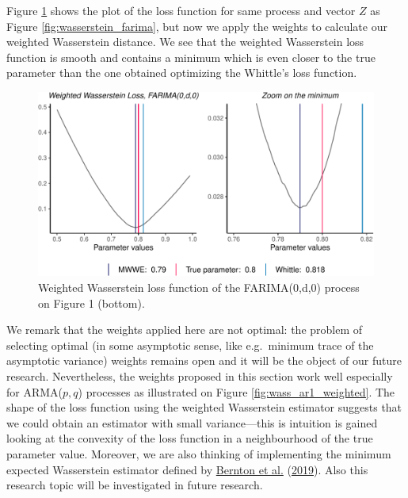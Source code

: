 \documentclass[
  11pt,
]{article}
\begin{document}
Figure \ref{fig:weighted_wasserstein} shows the plot of the loss
function for same process and vector \(Z\) as Figure
\ref{fig:wasserstein_farima}, but now we apply the weights to calculate
our weighted Wasserstein distance. We see that the weighted Wasserstein
loss function is smooth and contains a minimum which is even closer to
the true parameter than the one obtained optimizing the Whittle's loss
function.

\begin{figure}

{\centering \includegraphics[width=0.6\linewidth]{Master_thesis_V4_files/figure-latex/weighted_wasserstein-1} 

}

\caption{Weighted Wasserstein loss function of the FARIMA(0,d,0) process on Figure 1 (bottom).}\label{fig:weighted_wasserstein}
\end{figure}

We remark that the weights applied here are not optimal: the problem of
selecting optimal (in some asymptotic sense, like e.g.~minimum trace of
the asymptotic variance) weights remains open and it will be the object
of our future research. Nevertheless, the weights proposed in this
section work well especially for ARMA(\(p,q\)) processes as illustrated
on Figure \ref{fig:wass_ar1_weighted}. The shape of the loss function
using the weighted Wasserstein estimator suggests that we could obtain
an estimator with small variance---this is intuition is gained looking
at the convexity of the loss function in a neighbourhood of the true
parameter value. Moreover, we are also thinking of implementing the
minimum expected Wasserstein estimator defined by
\protect\hyperlink{ref-bernton2019parameter}{Bernton et al.}
(\protect\hyperlink{ref-bernton2019parameter}{2019}). Also this research
topic will be investigated in future research.
\end{document}
